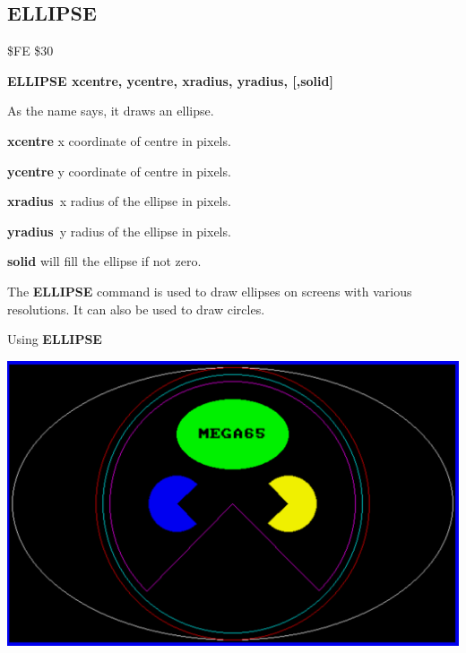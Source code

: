 \newpage
\subsection{ELLIPSE}
\begin{description}[leftmargin=2cm,style=nextline]
\item [Token:] \$FE \$30
\item [Format:] {\bf ELLIPSE xcentre, ycentre,
                xradius, yradius, [,solid]}
\item [Usage:] As the name says, it draws an ellipse.

               {\bf xcentre} x coordinate of centre in pixels.

               {\bf ycentre} y coordinate of centre in pixels.

               {\bf xradius} x radius of the ellipse in pixels.

               {\bf yradius} y radius of the ellipse in pixels.

               {\bf solid} will fill the ellipse if not zero.

\item [Remarks:] The {\bf ELLIPSE} command is used to draw ellipses on
               screens with various resolutions.
               It can also be used to draw circles.

\item [Example:] Using {\bf ELLIPSE}


\includegraphics[width=\linewidth]{images/ellipse.png}


\end{description}
